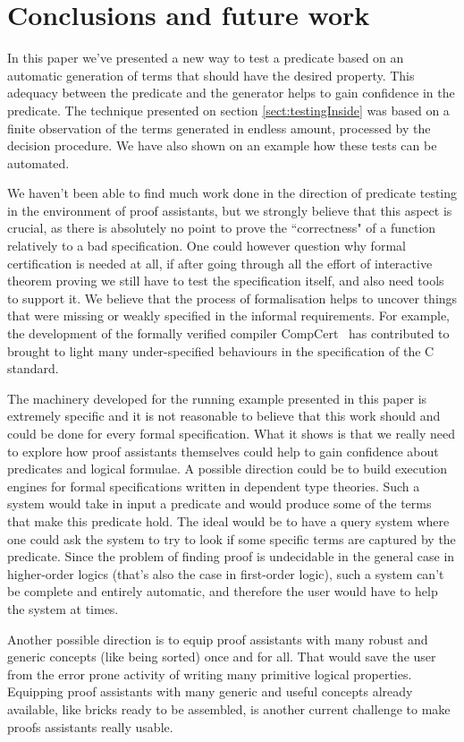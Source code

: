 \section{Conclusions and future work}
\label{sect:Conclusion}

In this paper we've presented a new way to test a predicate based on an automatic generation of terms that should have the desired property. This adequacy between the predicate and the generator helps to gain confidence in the predicate. The technique presented on section \ref{sect:testingInside} was based on a finite observation of the terms generated in endless amount, processed by the decision procedure. We have also shown on an example how these tests can be automated. 

We haven't been able to find much work done in the direction of predicate testing in the environment of proof assistants, but we strongly believe that this aspect is crucial, as there is absolutely no point to prove the ``correctness" of a function relatively to a bad specification. One could however question why formal certification is needed at all, if after going through all the effort of interactive theorem proving we still have to test the specification itself, and also need tools to support it. We believe that the process of formalisation helps to uncover things that were missing or weakly specified in the informal requirements. For example, the development of the formally verified compiler CompCert~\cite{Krebbers2014} has contributed to brought to light many under-specified behaviours in the specification of the C standard.

The machinery developed for the running example presented in this paper is extremely specific and it is not reasonable to believe that this work should and could be done for every formal specification. What it shows is that we really need to explore how proof assistants themselves could help to gain confidence about predicates and logical formulae. A possible direction could be to build execution engines for formal specifications written in dependent type theories. Such a system would take in input a predicate and would produce some of the terms that make this predicate hold. The ideal would be to have a query system where one could ask the system to try to look if some specific terms are captured by the predicate. Since the problem of finding proof is undecidable in the general case in higher-order logics (that's also the case in first-order logic), such a system can't be complete and entirely automatic, and therefore the user would have to help the system at times.

Another possible direction is to equip proof assistants with many robust and generic concepts (like being sorted) once and for all. That would save the user from the error prone activity of writing many primitive logical properties. Equipping proof assistants with many generic and useful concepts already available, like bricks ready to be assembled, is another current challenge to make proofs assistants really usable.